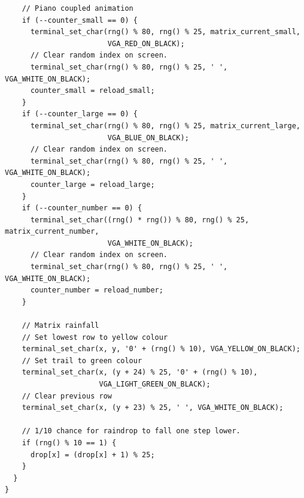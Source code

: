 \documentclass[../main.tex]{subfiles}
\begin{document}
\begin{verbatim}
    // Piano coupled animation
    if (--counter_small == 0) {
      terminal_set_char(rng() % 80, rng() % 25, matrix_current_small,
                        VGA_RED_ON_BLACK);
      // Clear random index on screen.
      terminal_set_char(rng() % 80, rng() % 25, ' ', VGA_WHITE_ON_BLACK);
      counter_small = reload_small;
    }
    if (--counter_large == 0) {
      terminal_set_char(rng() % 80, rng() % 25, matrix_current_large,
                        VGA_BLUE_ON_BLACK);
      // Clear random index on screen.
      terminal_set_char(rng() % 80, rng() % 25, ' ', VGA_WHITE_ON_BLACK);
      counter_large = reload_large;
    }
    if (--counter_number == 0) {
      terminal_set_char((rng() * rng()) % 80, rng() % 25, matrix_current_number,
                        VGA_WHITE_ON_BLACK);
      // Clear random index on screen.
      terminal_set_char(rng() % 80, rng() % 25, ' ', VGA_WHITE_ON_BLACK);
      counter_number = reload_number;
    }

    // Matrix rainfall
    // Set lowest row to yellow colour
    terminal_set_char(x, y, '0' + (rng() % 10), VGA_YELLOW_ON_BLACK);
    // Set trail to green colour
    terminal_set_char(x, (y + 24) % 25, '0' + (rng() % 10),
                      VGA_LIGHT_GREEN_ON_BLACK);
    // Clear previous row
    terminal_set_char(x, (y + 23) % 25, ' ', VGA_WHITE_ON_BLACK);

    // 1/10 chance for raindrop to fall one step lower.
    if (rng() % 10 == 1) {
      drop[x] = (drop[x] + 1) % 25;
    }
  }
}

\end{verbatim}
\end{document}
